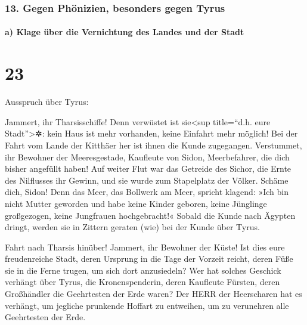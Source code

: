 \hypertarget{gegen-phuxf6nizien-besonders-gegen-tyrus}{%
\subsubsection{13. Gegen Phönizien, besonders gegen
Tyrus}\label{gegen-phuxf6nizien-besonders-gegen-tyrus}}

\hypertarget{a-klage-uxfcber-die-vernichtung-des-landes-und-der-stadt}{%
\paragraph{a) Klage über die Vernichtung des Landes und der
Stadt}\label{a-klage-uxfcber-die-vernichtung-des-landes-und-der-stadt}}

\hypertarget{section-22}{%
\section{23}\label{section-22}}

Ausspruch über Tyrus:

Jammert, ihr Tharsisschiffe! Denn verwüstet ist sie\textless sup
title=``d.h. eure Stadt''\textgreater✲: kein Haus ist mehr vorhanden,
keine Einfahrt mehr möglich! Bei der Fahrt vom Lande der Kitthäer her
ist ihnen die Kunde zugegangen. Verstummet, ihr Bewohner
der Meeresgestade, Kaufleute von Sidon, Meerbefahrer, die dich bisher
angefüllt haben! Auf weiter Flut war das Getreide des
Sichor, die Ernte des Nilflusses ihr Gewinn, und sie wurde zum
Stapelplatz der Völker. Schäme dich, Sidon! Denn das Meer,
das Bollwerk am Meer, spricht klagend: »Ich bin nicht Mutter geworden
und habe keine Kinder geboren, keine Jünglinge großgezogen, keine
Jungfrauen hochgebracht!« Sobald die Kunde nach Ägypten
dringt, werden sie in Zittern geraten (wie) bei der Kunde über Tyrus.

Fahrt nach Tharsis hinüber! Jammert, ihr Bewohner der
Küste! Ist dies eure freudenreiche Stadt, deren Ursprung
in die Tage der Vorzeit reicht, deren Füße sie in die Ferne trugen, um
sich dort anzusiedeln? Wer hat solches Geschick verhängt
über Tyrus, die Kronenspenderin, deren Kaufleute Fürsten, deren
Großhändler die Geehrtesten der Erde waren? Der HERR der
Heerscharen hat es verhängt, um jegliche prunkende Hoffart zu entweihen,
um zu verunehren alle Geehrtesten der Erde.

